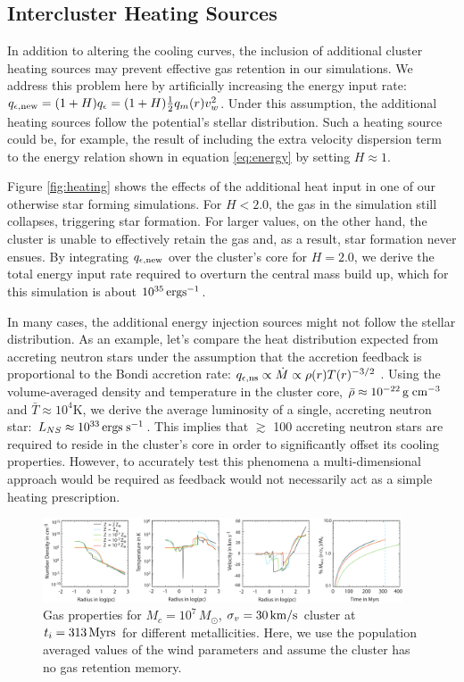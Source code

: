 \documentclass[fleqn,usenatbib]{mnras}
\begin{document}
\subsection{Intercluster Heating Sources}

In addition to altering the cooling curves, the inclusion of additional cluster heating sources may prevent effective gas retention in our simulations.  We address this 
problem here by artificially increasing the energy input rate: 
$q_{\epsilon,{\rm new}} = (1+H)q_\epsilon = (1+H)\frac{1}{2} q_m(r)v_w^2$. Under this assumption, the additional  heating sources follow the potential's stellar distribution.  Such a heating source could be, for example, the result of including the extra velocity dispersion term to the energy relation shown in equation \ref{eq:energy} by setting $H\approx1$.

Figure \ref{fig:heating} shows the effects of the additional  heat input in one of our otherwise star forming simulations.  For $H < 2.0$, the gas in the simulation still collapses, triggering star formation.  For larger  values, on the other hand, the cluster is unable to effectively retain the gas  and, as a result, star formation never ensues.  By integrating $q_{\epsilon,{\rm new}}$ over the cluster's core for $H=2.0$, we derive the total energy input rate required to overturn the central mass build up, which for this simulation is about  $10^{35} \, {\rm erg s^{-1}}$. 

In many  cases, the additional energy injection sources might not follow the stellar distribution.  As an example, let's compare the heat distribution  expected from accreting neutron stars under the assumption that the accretion feedback  is proportional to the Bondi accretion rate:  
$q_{\epsilon,{\rm ns}} \propto \dot{M} \propto \rho(r) T(r)^{-3/2}$ \citep{bondi}.   Using  the volume-averaged density and 
temperature in the 
cluster core, $\bar{\rho}  \approx 10^{-22} \, {\rm g\; cm^{-3}}$ and $\bar{T}  \approx 10^4$K,  we derive  the average  luminosity of a single, accreting neutron star: $L_{NS} \approx 10^{33} \, 
{\rm ergs\; s^{-1}}$.  This implies that  $\gtrsim$ 100 accreting neutron stars are required to reside in the cluster's core  in order to significantly offset  its cooling  properties. However, to accurately test this phenomena a multi-dimensional  approach would be required as feedback  would not 
necessarily act as a simple heating prescription.



\begin{figure}
\centering\includegraphics[width=0.95\textwidth]{fig7.pdf}
\caption{Gas properties for $M_c = 10^7 \, M_\odot$, $\sigma_v = 30 \, {\rm km/s}$ cluster 
at $t_{i} = 313 \, {\rm Myrs}$ for different metallicities.    Here, we use the population averaged values of the wind parameters and assume the cluster has no gas retention memory.}
\label{fig:fig7}
\end{figure} 
\end{document}
